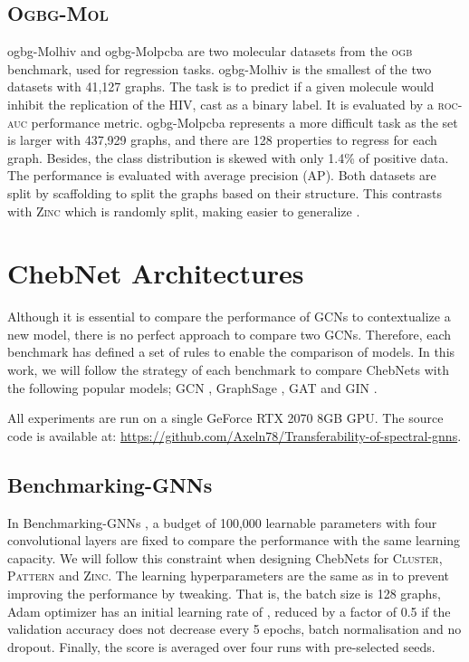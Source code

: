 \documentclass[letterpaper]{article} \usepackage{aaai21}  \usepackage{times}  \usepackage{helvet} \usepackage{courier}  \usepackage[hyphens]{url}  \usepackage{graphicx} \usepackage{natbib}  \usepackage{caption} \frenchspacing  \setlength{\pdfpagewidth}{8.5in}  \setlength{\pdfpageheight}{11in}
\begin{document}
\subsection{\textsc{Ogbg-Mol}}

ogbg-Molhiv and ogbg-Molpcba are two molecular datasets from the \textsc{ogb} benchmark, used for regression tasks.
ogbg-Molhiv is the smallest of the two datasets with 41,127 graphs.
The task is to predict if a given molecule would inhibit the replication of the HIV, cast as a binary label. It is evaluated by a \textsc{roc-auc} performance metric.
ogbg-Molpcba represents a more difficult task as the set is larger with 437,929 graphs, and there are 128 properties to regress for each graph. Besides, the class distribution is skewed with only 1.4\% of positive data. The performance is evaluated with average precision (AP). Both datasets are split by scaffolding to split the graphs based on their structure. This contrasts with \textsc{Zinc} which is randomly split, making easier to generalize \cite{hu_open_2020}.


\section{ChebNet Architectures}

Although it is essential to compare the performance of GCNs to contextualize a new model, there is no perfect approach to compare two GCNs.
Therefore, each benchmark has defined a set of rules to enable the comparison of models. In this work, we will follow the strategy of each benchmark to compare ChebNets with the following popular models; GCN \cite{kipf_semi-supervised_2017}, GraphSage \cite{hamilton_inductive_2017}, GAT \cite{velickovic_graph_2018} and GIN \cite{xu_how_2019}.

All experiments are run on a single GeForce RTX 2070 8GB GPU. The source code is available at:
\url{https://github.com/Axeln78/Transferability-of-spectral-gnns}.


\subsection{Benchmarking-GNNs}
In Benchmarking-GNNs \cite{dwivedi_benchmarking_2020}, a budget of 100,000 learnable parameters with four convolutional layers are fixed to compare the performance with the same learning capacity. We will follow this constraint when designing ChebNets for \textsc{Cluster}, \textsc{Pattern} and \textsc{Zinc}. The learning hyperparameters are the same as in \cite{dwivedi_benchmarking_2020} to prevent improving the performance by tweaking. That is, the batch size is 128 graphs, Adam optimizer has an initial learning rate of , reduced by a factor of 0.5 if the validation accuracy does not decrease every 5 epochs, batch normalisation and no dropout. Finally, the score is averaged over four runs with pre-selected seeds.
\end{document}
